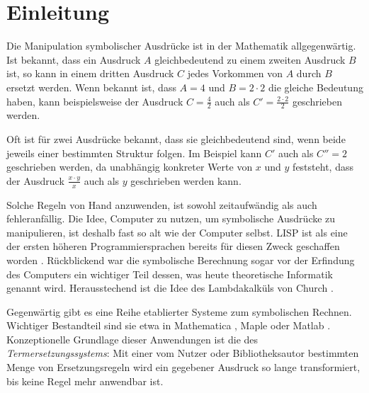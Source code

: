 

\chapter{Einleitung} \label{secEinleitung}

Die Manipulation symbolischer Ausdrücke ist in der Mathematik allgegenwärtig. Ist bekannt, dass ein Ausdruck $A$ gleichbedeutend zu einem zweiten Ausdruck $B$ ist, so kann in einem dritten Ausdruck $C$ jedes Vorkommen von $A$ durch $B$ ersetzt werden. 
Wenn bekannt ist, dass $A = 4$ und $B = 2 \cdot 2$ die gleiche Bedeutung haben, kann beispielsweise der Ausdruck $C = \frac{4}{2}$ auch als $C' = \frac{2 \cdot 2}{2}$ geschrieben werden.

Oft ist für zwei Ausdrücke bekannt, dass sie gleichbedeutend sind, wenn beide jeweils einer bestimmten Struktur folgen. Im Beispiel kann $C'$ auch als $C'' = 2$ geschrieben werden, da unabhängig konkreter Werte von $x$ und $y$ feststeht, dass der Ausdruck $\frac{x \cdot y}{x}$ auch als $y$ geschrieben werden kann.

Solche Regeln von Hand anzuwenden, ist sowohl zeitaufwändig als auch fehleranfällig. 
Die Idee, Computer zu nutzen, um symbolische Ausdrücke zu manipulieren, ist deshalb fast so alt wie der Computer selbst.  LISP ist als eine der ersten höheren Programmiersprachen bereits für diesen Zweck geschaffen worden \cite{lisp}. Rückblickend war die symbolische Berechnung sogar vor der Erfindung des Computers ein wichtiger Teil dessen, was heute theoretische Informatik genannt wird. Herausstechend ist die Idee des Lambdakalküls von Church \cite{ChurchLambda36}. 

Gegenwärtig gibt es eine Reihe etablierter Systeme zum symbolischen Rechnen. Wichtiger Bestandteil sind sie etwa in Mathematica \cite{MathematicaSymbolic}, Maple \cite{MapleSymbolic} oder Matlab \cite{MatlabSymbolic}.
Konzeptionelle Grundlage dieser Anwendungen ist die des \emph{Termersetzungssystems}: Mit einer vom Nutzer oder Bibliotheksautor bestimmten Menge von Ersetzungsregeln wird ein gegebener Ausdruck so lange transformiert, bis keine Regel mehr anwendbar ist.


